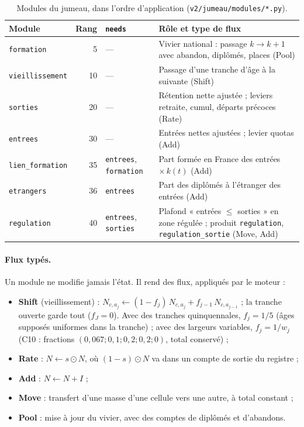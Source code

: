 \begin{table}[h]
\centering\small
\begin{tabular}{lrlp{7.2cm}}
\toprule
Module & Rang & \texttt{needs} & Rôle et type de flux \\
\midrule
\texttt{formation}      & 5  & --- & Vivier national : passage $k \to k+1$ avec abandon, diplômés, places (Pool) \\
\texttt{vieillissement} & 10 & --- & Passage d'une tranche d'âge à la suivante (Shift) \\
\texttt{sorties}        & 20 & --- & Rétention nette ajustée ; leviers retraite, cumul, départs précoces (Rate) \\
\texttt{entrees}        & 30 & --- & Entrées nettes ajustées ; levier quotas (Add) \\
\texttt{lien\_formation} & 35 & \texttt{entrees}, \texttt{formation} & Part formée en France des entrées
                          $\times\, k(t)$ (Add) \\
\texttt{etrangers}      & 36 & \texttt{entrees} & Part des diplômés à l'étranger des entrées (Add) \\
\texttt{regulation}     & 40 & \texttt{entrees}, \texttt{sorties} & Plafond « entrées $\le$ sorties » en zone
                          régulée ; produit \texttt{regulation}, \texttt{regulation\_sortie} (Move, Add) \\
\bottomrule
\end{tabular}
\caption{Modules du jumeau, dans l'ordre d'application (\texttt{v2/jumeau/modules/*.py}).}
\label{jum:tab:modules}
\end{table}

\paragraph{Flux typés.} Un module ne modifie jamais l'état. Il rend des flux, appliqués par le moteur :
\begin{itemize}
  \item \textbf{Shift} (vieillissement) : $N_{c,a_j} \leftarrow (1 - f_j)\,N_{c,a_j} + f_{j-1}\,N_{c,a_{j-1}}$ ; la
        tranche ouverte garde tout ($f_J = 0$). Avec des tranches quinquennales, $f_j = 1/5$\suppose{} (âges
        supposés uniformes dans la tranche) ; avec des largeurs variables, $f_j = 1/w_j$ (C10 : fractions
        $(0{,}067 ; 0{,}1 ; 0{,}2 ; 0{,}2 ; 0)$\mesure{}, total conservé) ;
  \item \textbf{Rate} : $N \leftarrow s \odot N$, où $(1 - s) \odot N$ va dans un compte de sortie du registre ;
  \item \textbf{Add} : $N \leftarrow N + I$ ;
  \item \textbf{Move} : transfert d'une masse d'une cellule vers une autre, à total constant ;
  \item \textbf{Pool} : mise à jour du vivier, avec des comptes de diplômés et d'abandons.
\end{itemize}

